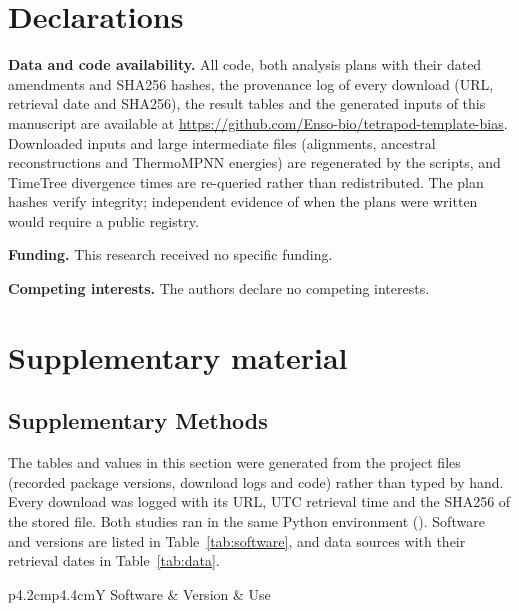 \documentclass[11pt]{article}
\begin{document}
\section*{Declarations}
\noindent\textbf{Data and code availability.} All code, both analysis plans with their dated amendments and SHA256 hashes, the provenance log of every download (URL, retrieval date and SHA256), the result tables and the generated inputs of this manuscript are available at \url{https://github.com/Enso-bio/tetrapod-template-bias}. Downloaded inputs and large intermediate files (alignments, ancestral reconstructions and ThermoMPNN energies) are regenerated by the scripts, and TimeTree divergence times are re-queried rather than redistributed. The plan hashes verify integrity; independent evidence of when the plans were written would require a public registry.

\noindent\textbf{Funding.} This research received no specific funding.

\noindent\textbf{Competing interests.} The authors declare no competing interests.




\clearpage
\appendix
\renewcommand{\thetable}{S\arabic{table}}
\renewcommand{\thefigure}{S\arabic{figure}}
\setcounter{table}{0}
\setcounter{figure}{0}
\section*{Supplementary material}

\subsection*{Supplementary Methods}
The tables and values in this section were generated from the project files (recorded package versions, download logs and code) rather than typed by hand. Every download was logged with its URL, UTC retrieval time and the SHA256 of the stored file. Both studies ran in the same Python environment (\RunPlatform). Software and versions are listed in Table~\ref{tab:software}, and data sources with their retrieval dates in Table~\ref{tab:data}.

\begin{table}[htbp]
\centering
\caption{Software and versions.}
\label{tab:software}
\small
\begin{tabularx}{\textwidth}{p{4.2cm}p{4.4cm}Y}
\toprule
Software & Version & Use \\
\midrule
\SoftwareRows
\bottomrule
\end{tabularx}
\end{table}
\end{document}
